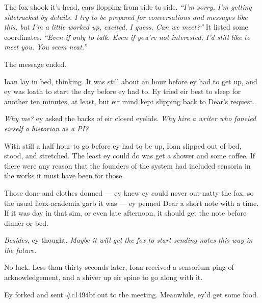 The fox shook it's head, ears flopping from side to side. \emph{``I'm sorry, I'm getting sidetracked by details. I try to be prepared for conversations and messages like this, but I'm a little worked up, excited, I guess. Can we meet?''} It listed some coordinates. \emph{``Even if only to talk. Even if you're not interested, I'd still like to meet you. You seem neat.''}

The message ended.

Ioan lay in bed, thinking. It was still about an hour before ey had to get up, and ey was loath to start the day before ey had to. Ey tried eir best to sleep for another ten minutes, at least, but eir mind kept slipping back to Dear's request.

\emph{Why me?} ey asked the backs of eir closed eyelids. \emph{Why hire a writer who fancied eirself a historian as a PI?}

With still a half hour to go before ey had to be up, Ioan slipped out of bed, stood, and stretched. The least ey could do was get a shower and some coffee. If there were any reason that the founders of the system had included sensoria in the works it must have been for those.

Those done and clothes donned --- ey knew ey could never out-natty the fox, so the usual faux-academia garb it was --- ey penned Dear a short note with a time. If it was day in that sim, or even late afternoon, it should get the note before dinner or bed.

\emph{Besides,} ey thought. \emph{Maybe it will get the fox to start sending notes this way in the future.}

No luck. Less than thirty seconds later, Ioan received a sensorium ping of acknowledgement, and a shiver up eir spine to go along with it.

Ey forked and sent \#c1494bf out to the meeting. Meanwhile, ey'd get some food.
